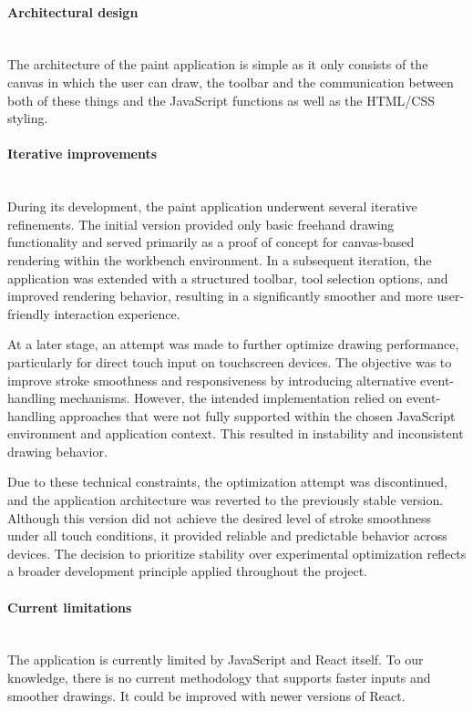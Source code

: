 \documentclass[a4paper,12pt]{article}
\begin{document}
\paragraph{Architectural design}\mbox{} \\
The architecture of the paint application is simple as it only consists of the canvas in which the user can draw, the toolbar and the communication between both of these things and the JavaScript functions as well as the HTML/CSS styling. 
\newpage
\paragraph{Iterative improvements}\mbox{} \\
During its development, the paint application underwent several iterative refinements. The initial version provided only basic freehand drawing functionality and served primarily as a proof of concept for canvas-based rendering within the workbench environment. In a subsequent iteration, the application was extended with a structured toolbar, tool selection options, and improved rendering behavior, resulting in a significantly smoother and more user-friendly interaction experience.

At a later stage, an attempt was made to further optimize drawing performance, particularly for direct touch input on touchscreen devices. The objective was to improve stroke smoothness and responsiveness by introducing alternative event-handling mechanisms. However, the intended implementation relied on event-handling approaches that were not fully supported within the chosen JavaScript environment and application context. This resulted in instability and inconsistent drawing behavior.

Due to these technical constraints, the optimization attempt was discontinued, and the application architecture was reverted to the previously stable version. Although this version did not achieve the desired level of stroke smoothness under all touch conditions, it provided reliable and predictable behavior across devices. The decision to prioritize stability over experimental optimization reflects a broader development principle applied throughout the project.

\newpage
\paragraph{Current limitations}\mbox{} \\
The application is currently limited by JavaScript and React itself. To our knowledge, there is no current methodology that supports faster inputs and smoother drawings. 
It could be improved with newer versions of React. 
\end{document}
